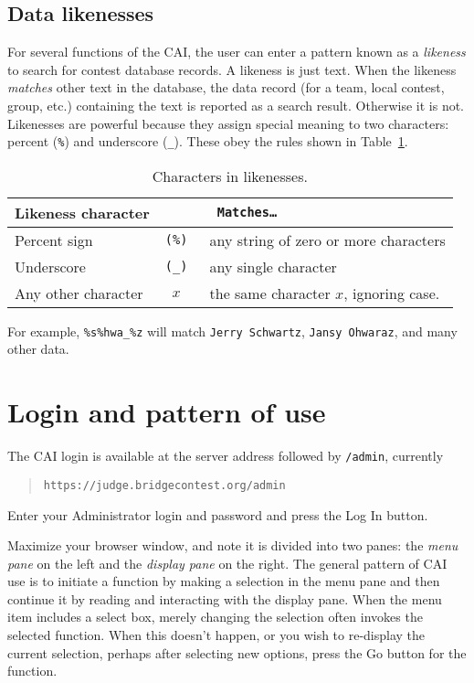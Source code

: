 \documentclass[11pt,letterpaper]{refart}
\def\nada{\hspace{0pt}}
\def\ui#1{\textsf{#1}}
\begin{document}
\subsection{Data likenesses}
For several functions of the CAI, the user can enter a pattern known
as a \emph{likeness} to search for contest database records. A
likeness is just text. When the likeness \emph{matches} other text in
the database, the data record (for a team, local contest, group, etc.)
containing the text is reported as a search result. Otherwise it is
not.  Likenesses are powerful because they assign special meaning to
two characters: percent (\texttt{\%}) and underscore
(\texttt{\_}). These obey the rules shown in
Table~\ref{tbl:likeness}.\
\begin{table}
\centering
\caption{Characters in likenesses.}
\begin{tabular}{l>{\tt}cl}
\multicolumn{2}{l}{\bfseries Likeness character} & {\bfseries Matches\ldots} \\ \hline
Percent sign & (\texttt{\%}\nada) & any string of zero or more characters \\
Underscore  & (\texttt{\_}\nada)  & any single character \\
Any other character & $x$ & the same character $x$, ignoring case.
\end{tabular}
\label{tbl:likeness}
\end{table}

For example, \texttt{\%s\%hwa\_\%z} will match \texttt{Jerry Schwartz}, 
\texttt{Jansy Ohwaraz}, and many other data.

\section{Login and pattern of use}
The CAI login is available at the server address followed by
\texttt{/admin}, currently
\begin{quote} 
\texttt{https://judge.bridgecontest.org/admin}
\end{quote}
Enter your Administrator login and password and press the \ui{Log In} button.

Maximize your browser window, and note it is divided into two panes:
the \emph{menu pane} on the left and the \emph{display pane} on the
right. The general pattern of CAI use is to initiate a function by
making a selection in the menu pane and then continue it by reading
and interacting with the display pane. When the menu item includes a
select box, merely changing the selection often invokes the selected
function.  When this doesn't happen, or you wish to re-display the
current selection, perhaps after selecting new options, press the
\ui{Go} button for the function.
\end{document}
